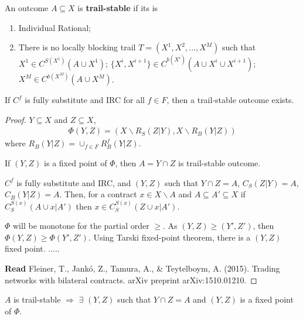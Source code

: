 \documentclass[11pt]{elegantbook}
\begin{document}
\begin{definition}
    \normalfont
    An outcome $A\subseteq X$ is \textbf{trail-stable} if its is
    \begin{enumerate}
        \item Individual Rational;
        \item There is no locally blocking trail $T=(X^1,X^2,...,X^M)$ such that
        \subitem $X^1\in C^{S(X^1)}(A\cup X^1)$;
        \subitem $\{X^i,X^{i+1}\}\in C^{b(X^{i})}(A\cup X^i\cup X^{i+1})$;
        \subitem $X^M\in C^{b(X^M)}(A\cup X^M)$.
    \end{enumerate}
\end{definition}

\begin{theorem}[Fleiner et al. 2016]
    If $C^f$ is fully substitute and IRC for all $f\in F$, then a trail-stable outcome exists.
\end{theorem}
\begin{proof}
    $Y\subseteq X$ and $Z\subseteq X$,
    \begin{equation}
        \begin{aligned}
            \Phi (Y,Z)=\left(X\backslash R_S(Z|Y), X\backslash R_B(Y|Z)\right)
        \end{aligned}
        \nonumber
    \end{equation}
    where $R_B(Y|Z)=\cup_{f\in F}R_B^f(Y|Z)$.
    \begin{claim}
        If $(Y,Z)$ is a fixed point of $\Phi$, then $A=Y\cap Z$ is trail-stable outcome.
    \end{claim}
    \begin{lemma}
        $C^f$ is fully substitute and IRC, and $(Y,Z)$ such that $Y \cap Z=A$, $C_S(Z|Y)=A$, $C_B(Y|Z)=A$. Then, for a contract $x\in X\backslash A$ and $A\subseteq A'\subseteq X$ if $C_S^{S(x)}(A\cup x|A')$ then $x\in C_S^{S(x)}(Z\cup x|A')$.
    \end{lemma}
    $\Phi$ will be monotone for the partial order $\geq$. As $(Y,Z)\geq (Y',Z')$, then $\Phi(Y,Z)\geq \Phi (Y',Z')$. Using Tarski fixed-point theorem, there is a $(Y,Z)$ fixed point.
    .....


    \textbf{Read} \textnormal{Fleiner, T., Jankó, Z., Tamura, A., \& Teytelboym, A. (2015). Trading networks with bilateral contracts. arXiv preprint arXiv:1510.01210.}
\end{proof}


\begin{proposition}
    $A$ is trail-stable $\Rightarrow$ $\exists$ $(Y,Z)$ such that $Y\cap Z=A$ and $(Y,Z)$ is a fixed point of $\Phi$.
\end{proposition}
\end{document}
